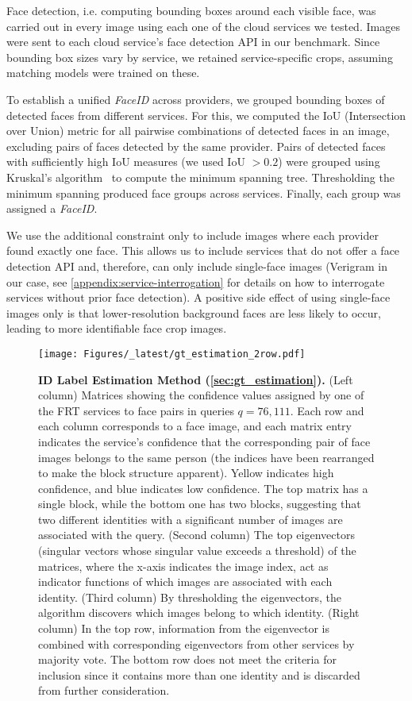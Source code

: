 \documentclass[10pt,twocolumn,letterpaper]{article}
\begin{document}
Face detection, i.e. computing bounding boxes around each visible face, was carried out in every image using each one of the cloud services we tested. Images were sent to each cloud service's face detection API in our benchmark. Since bounding box sizes vary by service, we retained service-specific crops, assuming matching models were trained on these.

To establish a unified \textit{FaceID} across providers, we grouped bounding boxes of detected faces from different services. For this, we computed the IoU (Intersection over Union) metric for all pairwise combinations of detected faces in an image, excluding pairs of faces detected by the same provider. Pairs of detected faces with sufficiently high IoU measures (we used IoU $>0.2$) were grouped using Kruskal's algorithm~\cite{kruskal1956shortest} to compute the minimum spanning tree. Thresholding the minimum spanning produced face groups across services. Finally, each group was assigned a \textit{FaceID}.

We use the additional constraint only to include images where each provider found exactly one face. This allows us to include services that do not offer a face detection API and, therefore, can only include single-face images (Verigram in our case, see \cref{appendix:service-interrogation} for details on how to interrogate services without prior face detection). 
A positive side effect of using single-face images only is that lower-resolution background faces are less likely to occur, leading to more identifiable face crop images. 

\begin{figure*}[t!]
    \centering
    \texttt{[image: Figures/\_latest/gt\_estimation\_2row.pdf]}
    \caption{{\bf ID Label Estimation Method (\cref{sec:gt_estimation}).}  
    (Left column) Matrices showing the confidence values assigned by one of the FRT services to face pairs in queries $q=76, 111$. Each row and each column corresponds to a face image, and each matrix entry indicates the service's confidence that the corresponding pair of face images belongs to the same person (the indices have been rearranged to make the block structure apparent). Yellow indicates high confidence, and blue indicates low confidence. The top matrix has a single block, while the bottom one has two blocks, suggesting that two different identities with a significant number of images are associated with the query.
    (Second column) The top eigenvectors (singular vectors whose singular value exceeds a threshold) of the matrices, where the x-axis indicates the image index, act as indicator functions of which images are associated with each identity.
    (Third column) By thresholding the eigenvectors, the algorithm discovers which images belong to which identity. 
    (Right column) In the top row, information from the eigenvector is combined with corresponding eigenvectors from other services by majority vote. The bottom row does not meet the criteria for inclusion since it contains more than one identity and is discarded from further consideration.}
    \label{fig:gt-estimation}
    \vspace{-2mm}
\end{figure*}
\end{document}
